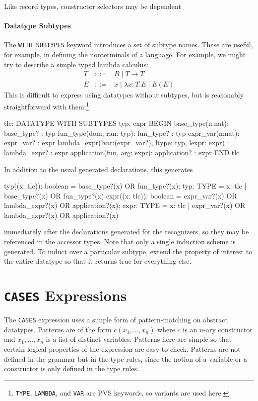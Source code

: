 Like record types, constructor selectors may be dependent

\paragraph{Datatype Subtypes}

The \texttt{WITH SUBTYPES} keyword introduces a set of subtype names.
These are useful, for example, in defining the nonterminals of a language.
For example, we might try to describe a simple typed lambda calculus:
\begin{eqnarray*}
T & ::= & B \;|\; T \rightarrow T \\
E & ::= & x \;|\; \lambda x:T.E \;|\; E(E)
\end{eqnarray*}
This is difficult to express using datatypes without subtypes, but is
reasonably straightforward with them:\footnote{\texttt{TYPE},
\texttt{LAMBDA}, and \texttt{VAR} are PVS keywords, so variants are used
here.}
\begin{pvsex}
tlc: DATATYPE WITH SUBTYPES typ, expr
 BEGIN
 base_type(n:nat): base_type? : typ
 fun_type(dom, ran: typ): fun_type? : typ
 expr_var(n:nat): expr_var? : expr
 lambda_expr(lvar:(expr_var?), ltype: typ, lexpr: expr)
                            : lambda_expr? : expr
 application(fun, arg: expr): application? : expr
 END tlc
\end{pvsex}
In addition to the usual generated declarations, this generates
\begin{pvsex}
  typ((x: tlc)): boolean = base_type?(x) OR fun_type?(x);
  typ: TYPE = \setb{}x: tlc | base_type?(x) OR fun_type?(x)\sete
  expr((x: tlc)): boolean =
     expr_var?(x) OR lambda_expr?(x) OR application?(x);
  expr: TYPE =
     \setb{}x: tlc | expr_var?(x) OR lambda_expr?(x) OR application?(x)\sete
\end{pvsex}
immediately after the declarations generated for the recognizers, so they
may be referenced in the accessor types.  Note that only a single
induction scheme is generated.  To induct over a particular subtype,
extend the property of interest to the entire datatype so that it returns
true for everything else.


\section{\texttt{CASES} Expressions}\label{cases-expressions}

The \texttt{CASES} expression uses a simple form of pattern-matching on
abstract datatypes.  Patterns are of the form $c(x_1,\ldots, x_n)$ where
$c$ is an $n$-ary constructor and $x_1,\ldots, x_n$ is a list of distinct
variables.  Patterns here are simple so that certain logical properties of
the expression are easy to check.  Patterns are not defined in the grammar
but in the type rules, since the notion of a variable or a constructor is
only defined in the type rules.


